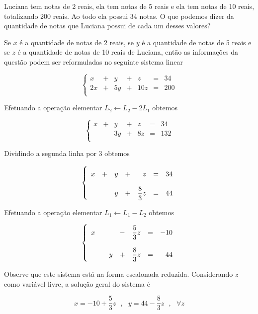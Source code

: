 \begin{problem}
Luciana tem notas de 2 reais, ela tem notas de 5 reais e ela tem notas de 10 reais, totalizando 200 reais.
Ao todo ela possui 34 notas. O que podemos dizer da quantidade de notas que Luciana possui de cada um desses valores?
\end{problem}
\begin{solution}
Se $x$ é a quantidade de notas de 2 reais, se $y$ é a quantidade de notas de 5 reais e se $z$ é a quantidade de notas de 10 reais de Luciana, então as informações da questão podem ser reformuladas no seguinte sistema linear

$$\left\{\begin{array}{rrrrrrr}
  x & + &   y & + &    z & = &   34  \\
 2x & + &  5y & + &  10z & = &  200  \\
\end{array} \right.$$

Efetuando a operação elementar $L_2 \leftarrow L_2 - 2L_1$ obtemos

$$\left\{\begin{array}{rrrrrrr}
  x & + &   y & + &    z & = &   34  \\
    &   &  3y & + &   8z & = &  132  \\
\end{array} \right.$$

Dividindo a segunda linha por 3 obtemos

$$\left\{\begin{array}{rrrrrrr}
  x & + &   y & + &               z & = &   34  \rule{0pt}{15pt} \\
    &   &   y & + &   \dfrac{8}{3}z & = &   44  \rule{0pt}{24pt} \\
\end{array} \right.$$

Efetuando a operação elementar $L_1 \leftarrow L_1 - L_2$ obtemos

$$\left\{\begin{array}{rrrrrrr}
  x &   &     & - &   \dfrac{5}{3}z & = &  -10  \rule{0pt}{15pt} \\
    &   &   y & + &   \dfrac{8}{3}z & = &   44  \rule{0pt}{25pt} \\
\end{array} \right.$$

Observe que este sistema está na forma escalonada reduzida. Considerando $z$ como variável livre, a solução geral do sistema é

$$x = -10 + \dfrac{5}{3}z \ \ \ , \ \ \ y = 44 - \dfrac{8}{3}z \ \ \ , \ \ \ \forall z $$


\end{solution}
